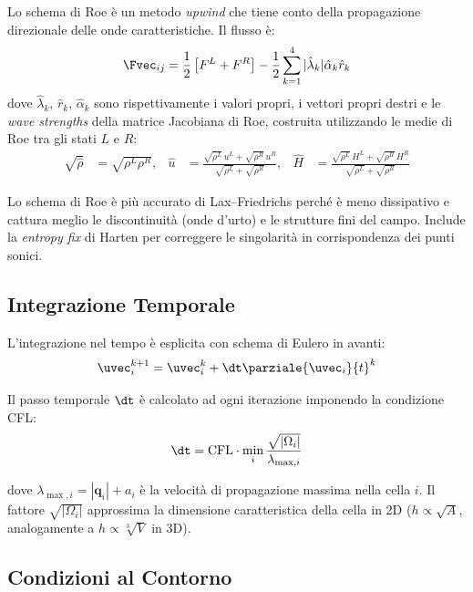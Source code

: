 Lo schema di Roe è un metodo \emph{upwind} che tiene conto della propagazione direzionale
delle onde caratteristiche. Il flusso è:
\begin{equation}
  \Fvec_{ij} = \frac{1}{2}\left[F^L + F^R\right]
               - \frac{1}{2} \sum_{k=1}^{4} |\hat{\lambda}_k| \hat{\alpha}_k \hat{r}_k
\end{equation}
dove $\hat{\lambda}_k$, $\hat{r}_k$, $\hat{\alpha}_k$ sono rispettivamente i valori propri,
i vettori propri destri e le \emph{wave strengths} della matrice Jacobiana di Roe, costruita
utilizzando le medie di Roe tra gli stati $L$ e $R$:
\begin{align}
  \sqrt{\hat{\rho}} &= \sqrt{\rho^L\rho^R}, &
  \hat{u} &= \frac{\sqrt{\rho^L}\,u^L + \sqrt{\rho^R}\,u^R}{\sqrt{\rho^L}+\sqrt{\rho^R}}, &
  \hat{H} &= \frac{\sqrt{\rho^L}\,H^L + \sqrt{\rho^R}\,H^R}{\sqrt{\rho^L}+\sqrt{\rho^R}}
\end{align}

Lo schema di Roe è più accurato di Lax--Friedrichs perché è meno dissipativo e cattura
meglio le discontinuità (onde d'urto) e le strutture fini del campo. Include la
\textit{entropy fix} di Harten per correggere le singolarità in corrispondenza dei punti sonici.

\subsection{Integrazione Temporale}

L'integrazione nel tempo è esplicita con schema di Eulero in avanti:
\begin{equation}
  \uvec_i^{k+1} = \uvec_i^k + \dt \parziale{\uvec_i}{t}^k
\end{equation}

Il passo temporale $\dt$ è calcolato ad ogni iterazione imponendo la condizione CFL:
\begin{equation}
  \dt = \text{CFL} \cdot \min_i \frac{\sqrt{|\Omega_i|}}{\lambda_{\max,i}}
  \label{eq:cfl}
\end{equation}

dove $\lambda_{\max,i} = |\bm{q}_i| + a_i$ è la velocità di propagazione massima nella
cella $i$. Il fattore $\sqrt{|\Omega_i|}$ approssima la dimensione caratteristica della cella
in 2D ($h \propto \sqrt{A}$, analogamente a $h \propto \sqrt[3]{V}$ in 3D).

\subsection{Condizioni al Contorno}

